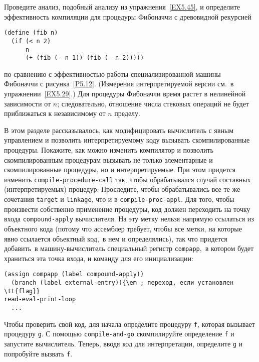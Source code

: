 \begin{exercise}{5.46}%
\label{EX5.46}%
%
Проведите анализ, подобный анализу из 
упражнения~\ref{EX5.45}, и определите эффективность компиляции для
процедуры Фибоначчи с древовидной рекурсией

\begin{Verbatim}[fontsize=\small]
(define (fib n)
  (if (< n 2)
      n
      (+ (fib (- n 1)) (fib (- n 2)))))
\end{Verbatim}
по сравнению с эффективностью работы специализированной машины
Фибоначчи с рисунка~\ref{P5.12}.  (Измерения
интерпретируемой версии см.~в упражнении~\ref{EX5.29}.)
Для процедуры Фибоначчи время растет в нелинейной зависимости от
$n$; следовательно, отношение числа стековых операций не
будет приближаться к независимому от $n$ пределу.
\end{exercise}
\begin{exercise}{5.47}%
\label{EX5.47}%
В этом разделе рассказывалось, как модифицировать
вычислитель с явным управлением и позволить интерпретируемому коду
вызывать скомпилированные процедуры.  Покажите, как можно изменить
компилятор и позволить скомпилированным процедурам вызывать не только
элементарные и скомпилированные процедуры, но и интерпретируемые.  При
этом придется изменить {\tt compile-procedure-call} так, чтобы
обрабатывался случай составных (интерпретируемых) процедур.
Проследите, чтобы обрабатывались все те же сочетания
{\tt target} и {\tt linkage}, что и в
{\tt compile-proc-appl}.  Для того, чтобы произвести собственно
применение процедуры, код должен переходить на точку входа
{\tt compound-apply} вычислителя.  На эту метку нельзя напрямую
ссылаться из объектного кода (потому что ассемблер требует, чтобы все
метки, на которые явно ссылается объектный код,~в нем и определялись),
так что придется добавить~в машину-вычислитель специальный регистр
{\tt compapp},~в котором будет храниться эта точка входа, и
команду для его инициализации:

\begin{Verbatim}[fontsize=\small]
  (assign compapp (label compound-apply))
  (branch (label external-entry)){\em ; переход, если установлен \tt{flag}}
read-eval-print-loop
  ...
\end{Verbatim}
Чтобы проверить свой код, для начала определите процедуру
{\tt f}, которая вызывает процедуру {\tt g}.  С помощью
{\tt compile-and-go} скомпилируйте определение {\tt f} и
запустите вычислитель.  Теперь, вводя код для интерпретации,
определите {\tt g} и попробуйте вызвать {\tt f}.
\end{exercise}
